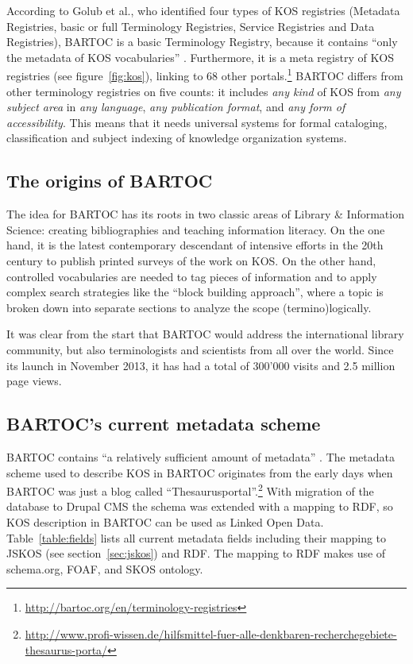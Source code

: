 \documentclass[12pt,a4paper]{llncs}
\begin{document}
According to Golub et al., who identified four types of KOS registries (Metadata Registries, basic or full Terminology Registries, Service Registries and Data Registries), BARTOC is a basic Terminology Registry, because it contains ``only the metadata of KOS vocabularies'' \cite[1903]{golub2014terminology}. Furthermore, it is a meta registry of KOS registries (see figure~\ref{fig:kos}), linking to 68 other portals.\footnote{\href{http://bartoc.org/en/terminology-registries}{http://bartoc.org/en/terminology-registries}} BARTOC differs from other terminology registries on five counts: it includes \textit{any kind} of KOS from \textit{any subject area} in \textit{any language}, \textit{any publication format}, and \textit{any form of accessibility}. This means that it needs universal systems for formal cataloging, classification and subject indexing of knowledge organization systems.

\subsection{The origins of BARTOC}
The idea for BARTOC has its roots in two classic areas of Library \& Information Science: creating bibliographies and teaching information literacy. On the one hand, it is the latest contemporary descendant of intensive efforts in the 20th century to publish printed surveys of the work on KOS. On the other hand, controlled vocabularies are needed to tag pieces of information and to apply complex search strategies like the ``block building approach'', where a topic is broken down into separate sections to analyze the scope (termino)logically.

It was clear from the start that BARTOC would address the international library community, but also terminologists and scientists from all over the world. Since its launch in November 2013, it has had a total of 300'000 visits and 2.5 million page views.

\subsection{BARTOC's current metadata scheme}
\label{sec:scheme}

BARTOC contains ``a relatively sufficient amount of metadata'' \cite{bratkova2014revue}. The metadata scheme used to describe KOS in BARTOC originates from the early days when BARTOC was just a blog called ``Thesaurusportal''.\footnote{\href{http://www.profi-wissen.de/hilfsmittel-fuer-alle-denkbaren-recherchegebiete-thesaurus-porta/}{http://www.profi-wissen.de/hilfsmittel-fuer-alle-denkbaren-recherchegebiete-thesaurus-porta/}} With migration of the database to Drupal CMS the schema was extended with a mapping to RDF, so KOS description in BARTOC can be used as Linked Open Data. Table~\ref{table:fields} lists all current metadata fields including their mapping to JSKOS (see section~\ref{sec:jskos}) and RDF. The mapping to RDF makes use of schema.org, FOAF, and SKOS ontology.
\end{document}
